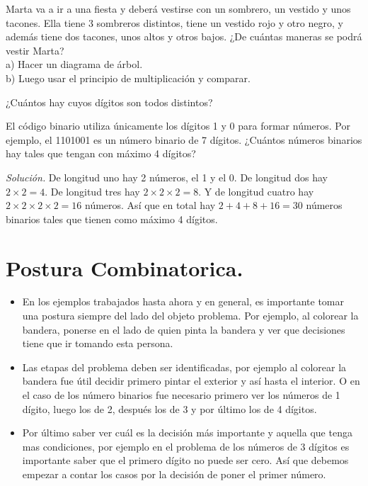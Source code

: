 \begin{problem}
	Marta va a ir a una fiesta y deberá vestirse con un sombrero, un vestido y unos tacones. Ella tiene 3 sombreros distintos, tiene un vestido rojo y otro negro, y además tiene dos tacones, unos altos y otros bajos. ¿De cuántas maneras se podrá vestir Marta?\\
	a) Hacer un diagrama de árbol.\\
	b) Luego usar el principio de multiplicación y comparar.
\end{problem}

\begin{problem}
	¿Cuántos hay cuyos dígitos son todos distintos?
	\label{problema3digitosdistintos}
\end{problem}

\begin{ejemplo}
	El código binario utiliza únicamente los dígitos 1 y 0 para formar números. Por ejemplo, el 1101001 es un número binario de 7 dígitos. ¿Cuántos números binarios hay tales que tengan con máximo 4 dígitos?
\end{ejemplo}

\textit{Solución.} De longitud uno hay 2 números, el 1 y el 0. De longitud dos hay $2\times 2 = 4$. De longitud tres hay $2\times 2\times 2=8$. Y de longitud cuatro hay $2\times 2\times 2\times 2=16$ números. Así que en total hay $2+4+8+16=30$ números binarios tales que tienen como máximo 4 dígitos.

\section*{Postura Combinatorica.}
\begin{itemize}
	\item En los ejemplos trabajados hasta ahora y en general, es importante tomar una postura siempre del lado del objeto problema. Por ejemplo, al colorear la bandera, ponerse en el lado de quien pinta la bandera y ver que decisiones tiene que ir tomando esta persona.
	\item Las etapas del problema deben ser identificadas, por ejemplo al colorear la bandera fue útil decidir primero pintar el exterior y así hasta el interior. O en el caso de los número binarios fue necesario primero ver los números de 1 dígito, luego los de 2, después los de 3 y por último los de 4 dígitos.
	\item Por último saber ver cuál es la decisión más importante y aquella que tenga mas condiciones, por ejemplo en el problema de los números de 3 dígitos es importante saber que el primero dígito no puede ser cero. Así que debemos empezar a contar los casos por la decisión de poner el primer número.
\end{itemize}

